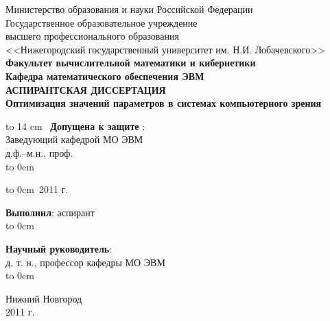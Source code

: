 \documentclass[12pt, a4paper, utf8]{article}
\begin{document}
\begin{titlepage}
\begin{center}
{Министерство образования и науки Российской Федерации\\ 
Государственное образовательное учреждение \\ 
высшего профессионального образования \\ 
<<Нижегородский государственный университет им. Н.И. Лобачевского>>\\

\bf{Факультет вычислительной математики и кибернетики\\
Кафедра математического обеспечения ЭВМ\\
}
\vspace{5em}
АСПИРАНТСКАЯ ДИССЕРТАЦИЯ\\
}
{\bf \Large	\textsf{ Оптимизация значений параметров в системах компьютерного зрения \\ } }
\end{center}
\vspace{3em}
\begin{multicols}{2}
\vbox to 14 cm{\ }
\noindent 
{\bf Допущена к защите} : {\hrulefill}\\
Заведующий кафедрой МО ЭВМ \\
д.ф.--м.н., проф. \\

\vspace*{1em}
{ \noindent
\hspace*{1.5cm}\hbox to 0cm{\raisebox{-1em}{\small Подпись}}\hspace{-1.5cm}{\hrulefill\ \ Стронгин Р. Г. }
}

\vspace*{1em}
{ \noindent
\hbox to 0cm{\raisebox{0.25em}{<<\qquad \qquad \quad >>}}{\hrulefill\ 2011 г. }
}

\noindent
{\bf Выполнил}: аспирант  \\

\vspace*{0.5em}
{ \noindent
\hspace*{1.5cm}\hbox to 0cm{\raisebox{-1em}{\small Подпись}}\hspace{-1.5cm}{\hrulefill\ \ Морозов А. С. }
}

\vspace{1.5em}
\noindent
{\bf Научный руководитель}: \\
д. т. н., профессор кафедры МО ЭВМ \\

{ \noindent
\hspace*{1.5cm}\hbox to 0cm{\raisebox{-1em}{\small Подпись}}\hspace{-1.5cm}{\hrulefill\ \ ФИО }
}
\end{multicols}
\vfill 
\begin{center} 
{\rm Нижний Новгород \\ 2011 г.} 
\end {center} 
\end{titlepage} 
\end{document}
